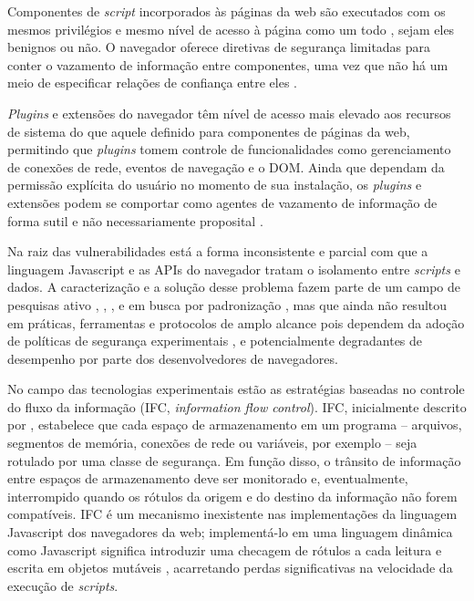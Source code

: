 \begin{alineas}
	\item Componentes de \textit{script} incorporados às páginas da web são executados com os mesmos privilégios e mesmo nível de acesso à página como um todo \cite[p. 2-3]{DeRyck2012}, sejam eles benignos ou não. O navegador oferece diretivas de segurança limitadas para conter o vazamento de informação entre componentes, uma vez que não há um meio de especificar relações de confiança entre eles \cite{Jang2010}.
	\item \textit{Plugins} e extensões do navegador têm nível de acesso mais elevado aos recursos de sistema do que aquele definido para componentes de páginas da web, permitindo que \textit{plugins} tomem controle de funcionalidades como gerenciamento de conexões de rede, eventos de navegação e o DOM. Ainda que dependam da permissão explícita do usuário no momento de sua instalação, os \textit{plugins} e extensões podem se comportar como agentes de vazamento de informação de forma sutil e não necessariamente proposital \cite{Heule2015_Most_Dangerous_Code}.
\end{alineas}

Na raiz das vulnerabilidades está a forma inconsistente e parcial com que a linguagem Javascript e as APIs do navegador tratam o isolamento entre \textit{scripts} e dados. A caracterização e a solução desse problema fazem parte de um campo de pesquisas ativo \cite{Stefan2014}, \cite{Hedin2014}, \cite{Bichhawat2014}, \cite{Magazinius2014} e em busca por padronização \cite{W3C:WebAppSec}, mas que ainda não resultou em práticas, ferramentas e protocolos de amplo alcance pois dependem da adoção de políticas de segurança experimentais \cite{Hedin2014}, \cite{Bichhawat2014} e potencialmente degradantes de desempenho \cite[p. 14]{Stefan2014} por parte dos desenvolvedores de navegadores.

No campo das tecnologias experimentais estão as estratégias baseadas no controle do fluxo da informação (IFC, \textit{information flow control}). IFC, inicialmente descrito por \cite{Denning1976}, estabelece que cada espaço de armazenamento em um programa -- arquivos, segmentos de memória, conexões de rede ou variáveis, por exemplo -- seja rotulado por uma classe de segurança. Em função disso, o trânsito de informação entre espaços de armazenamento deve ser monitorado e, eventualmente, interrompido quando os rótulos da origem e do destino da informação não forem compatíveis. IFC é um mecanismo inexistente nas implementações da linguagem Javascript dos navegadores da web; implementá-lo em uma linguagem dinâmica como Javascript significa introduzir uma checagem de rótulos a cada leitura e escrita em objetos mutáveis \cite[p.3]{Heule2015_IFC_Inside}, acarretando perdas significativas na velocidade da execução de \textit{scripts}.

